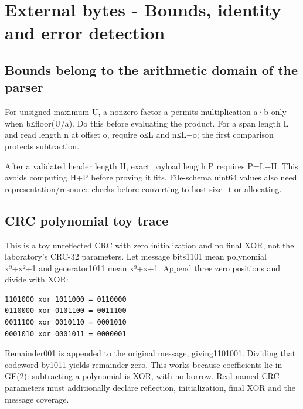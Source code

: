 \section{External bytes - Bounds, identity and error detection}\label{01-foundations-i-ch011-external-bytes---bounds-identity-and-error-detection}

\hypertarget{01-foundations-i-ch011-external-bytes---bounds-identity-and-error-detection}{}

\subsection{Bounds belong to the arithmetic domain of the parser}\label{01-foundations-i-ch011-bounds-belong-to-the-arithmetic-domain-of-the-parser}

\hypertarget{01-foundations-i-ch011-bounds-belong-to-the-arithmetic-domain-of-the-parser}{}

For unsigned maximum U, a nonzero factor a permits multiplication a·b only when b≤floor(U/a). Do this before evaluating the product. For a span length L and read length n at offset o, require o≤L and n≤L−o; the first comparison protects subtraction.

After a validated header length H, exact payload length P requires P=L−H. This avoids computing H+P before proving it fits. File-schema uint64 values also need representation/resource checks before converting to host size\_t or allocating.

\subsection{CRC polynomial toy trace}\label{01-foundations-i-ch011-crc-polynomial-toy-trace}

\hypertarget{01-foundations-i-ch011-crc-polynomial-toy-trace}{}

This is a toy unreflected CRC with zero initialization and no final XOR, not the laboratory's CRC-32 parameters. Let message bits1101 mean polynomial x³+x²+1 and generator1011 mean x³+x+1. Append three zero positions and divide with XOR:

\begin{verbatim}
1101000 xor 1011000 = 0110000
0110000 xor 0101100 = 0011100
0011100 xor 0010110 = 0001010
0001010 xor 0001011 = 0000001
\end{verbatim}

Remainder001 is appended to the original message, giving1101001. Dividing that codeword by1011 yields remainder zero. This works because coefficients lie in GF(2): subtracting a polynomial is XOR, with no borrow. Real named CRC parameters must additionally declare reflection, initialization, final XOR and the message coverage.

